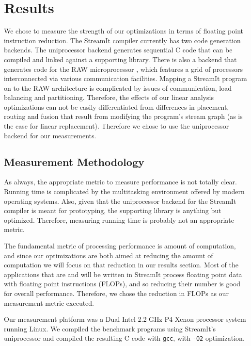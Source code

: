 \section{Results}
We chose to measure the strength of our optimizations in terms of 
floating point instruction reduction. The StreamIt compiler currently
has two code generation backends. The uniprocessor backend generates sequential C code
that can be compiled and linked against a supporting library. 
There is also a backend that generates code for the RAW microprocessor
\cite{waingold97baring, raw-micro}, which features
a grid of processors interconnected via various communication facilities. 
Mapping a StreamIt program on to the RAW architecture is complicated
by issues of communication, load balancing and partitioning\cite{streamit-asplos}. 
Therefore, the effects of our linear analysis optimizations can not
be easily differentiated from differences in placement, routing and fusion that result
from modifying the program's stream graph (as is the case for linear replacement). 
Therefore we chose to use the uniprocessor backend for our measurements.

\subsection{Measurement Methodology}
As always, the appropriate metric to measure performance is not totally clear. 
Running time is complicated by the multitasking environment offered by 
modern operating systems. Also, given that the uniprocessor backend for
the StreamIt compiler is meant for prototyping, the supporting 
library is anything but optimized. Therefore, measuring running time is
probably not an appropriate metric.

The fundamental metric of processing performance is amount of computation, and since
our optimizations are both aimed at reducing the amount of computation we will focus 
on that reduction in our results section. Most of the applications that are and will
be written in StreamIt process floating point data with floating point instructions (FLOPs), 
and so reducing their number is good for overall performance. 
Therefore, we chose the reduction in FLOPs as our measurement metric executed.

Our measurement platform was a Dual Intel 2.2 GHz P4 Xenon processor system 
running Linux. We compiled the benchmark programs using StreamIt's uniprocessor
and compiled the resulting C code with {\tt gcc}, with {\tt -O2} optimization.

